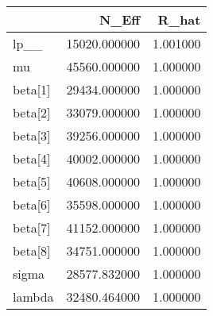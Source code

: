 \begin{tabular}{lrr}
\toprule
 & N\_Eff & R\_hat \\
\midrule
lp\_\_ & 15020.000000 & 1.001000 \\
mu & 45560.000000 & 1.000000 \\
beta[1] & 29434.000000 & 1.000000 \\
beta[2] & 33079.000000 & 1.000000 \\
beta[3] & 39256.000000 & 1.000000 \\
beta[4] & 40002.000000 & 1.000000 \\
beta[5] & 40608.000000 & 1.000000 \\
beta[6] & 35598.000000 & 1.000000 \\
beta[7] & 41152.000000 & 1.000000 \\
beta[8] & 34751.000000 & 1.000000 \\
sigma & 28577.832000 & 1.000000 \\
lambda & 32480.464000 & 1.000000 \\
\bottomrule
\end{tabular}
